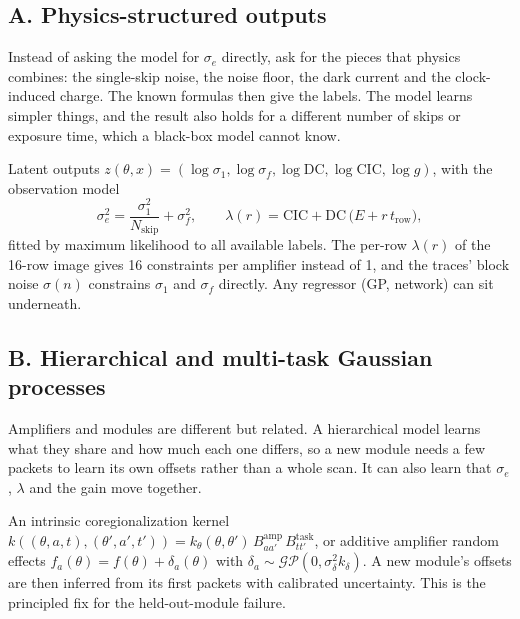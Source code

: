 \documentclass[10pt]{article}
\begin{document}
\subsection*{A. Physics-structured outputs}
\begin{basic}
Instead of asking the model for $\sigma_e$ directly, ask for the pieces that physics combines: the single-skip noise, the noise floor, the
dark current and the clock-induced charge. The known formulas then give the labels. The model learns simpler things, and the result also
holds for a different number of skips or exposure time, which a black-box model cannot know.
\end{basic}
\begin{advanced}
Latent outputs $z(\theta, x) = (\log\sigma_1, \log\sigma_f, \log\text{DC}, \log\text{CIC}, \log g)$, with the observation model
\begin{equation}
\sigma_e^2 = \frac{\sigma_1^2}{N_\text{skip}} + \sigma_f^2,\qquad \lambda(r) = \text{CIC} + \text{DC}\,\bigl(E + r\,t_\text{row}\bigr),
\end{equation}
fitted by maximum likelihood to all available labels. The per-row $\lambda(r)$ of the 16-row image gives 16 constraints per amplifier
instead of 1, and the traces' block noise $\sigma(n)$ constrains $\sigma_1$ and $\sigma_f$ directly. Any regressor (GP, network) can sit
underneath.
\end{advanced}

\subsection*{B. Hierarchical and multi-task Gaussian processes}
\begin{basic}
Amplifiers and modules are different but related. A hierarchical model learns what they share and how much each one differs, so a new
module needs a few packets to learn its own offsets rather than a whole scan. It can also learn that $\sigma_e$, $\lambda$ and the gain
move together.
\end{basic}
\begin{advanced}
An intrinsic coregionalization kernel $k((\theta,a,t),(\theta',a',t')) = k_\theta(\theta,\theta')\,B^{\text{amp}}_{aa'}\,B^{\text{task}}_{tt'}$, or
additive amplifier random effects $f_a(\theta) = f(\theta) + \delta_a(\theta)$ with
$\delta_a \sim \mathcal{GP}(0, \sigma_\delta^2 k_\delta)$. A new module's offsets are then inferred from its first packets with calibrated
uncertainty. This is the principled fix for the held-out-module failure.
\end{advanced}
\end{document}
